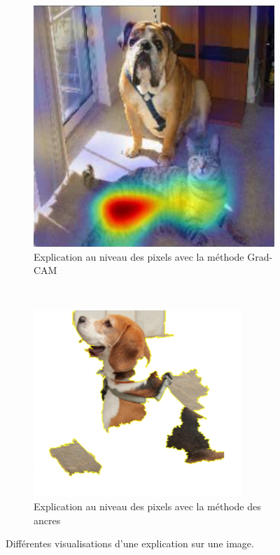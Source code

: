 \begin{figure}[htpb!]
    \centering
    \begin{subfigure}[b]{0.44\textwidth}
       \centering \includegraphics[width=\textwidth]{Introduction/figures/grad-cam.png}
       \caption{Explication au niveau des pixels avec la méthode Grad-CAM~\cite{Selvaraju2017}}\label{fig:gradcam}
    \end{subfigure}
    ~
    \begin{subfigure}[b]{0.44\textwidth}
       \centering \includegraphics[width=\textwidth]{Introduction/figures/beagle_anchor.png}
       \caption{Explication au niveau des pixels avec la méthode des ancres~\cite{Ribeiro2018}}\label{fig:anchor}
    \end{subfigure}
    \caption{Différentes visualisations d'une explication sur une image.
    }\label{fig:illustrations}
\end{figure}

